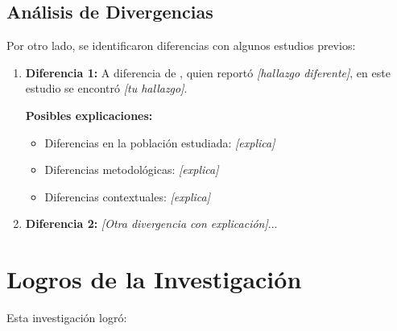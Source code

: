 \subsection{Análisis de Divergencias}
\label{subsec:divergencias}

Por otro lado, se identificaron diferencias con algunos estudios previos:

\begin{enumerate}
    \item \textbf{Diferencia 1:} A diferencia de \cite{autor3}, quien reportó \textit{{[hallazgo diferente]}}, en este estudio se encontró \textit{{[tu hallazgo]}}. 
    
    \textbf{Posibles explicaciones:}
    \begin{itemize}
        \item Diferencias en la población estudiada: \textit{{[explica]}}
        \item Diferencias metodológicas: \textit{{[explica]}}
        \item Diferencias contextuales: \textit{{[explica]}}
    \end{itemize}
    
    \item \textbf{Diferencia 2:} \textit{{[Otra divergencia con explicación]}}...
\end{enumerate}

\section{Logros de la Investigación}
\label{sec:logros}

Esta investigación logró:


